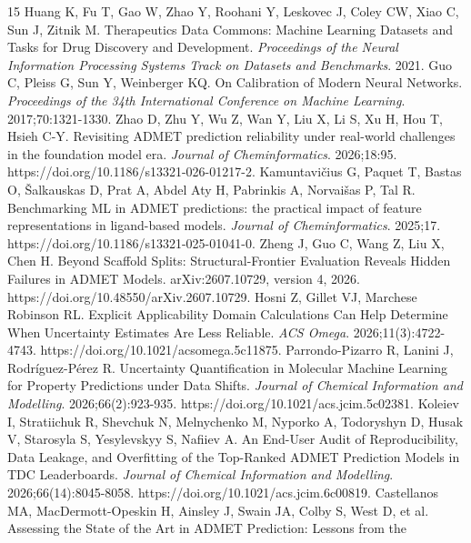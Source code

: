 \documentclass[
]{article}
\begin{document}
\begin{thebibliography}{15}
  Huang K, Fu T, Gao W, Zhao Y, Roohani Y, Leskovec J, Coley CW, Xiao C,
  Sun J, Zitnik M. Therapeutics Data Commons: Machine Learning Datasets
  and Tasks for Drug Discovery and Development. \emph{Proceedings of the
  Neural Information Processing Systems Track on Datasets and
  Benchmarks}. 2021.
  Guo C, Pleiss G, Sun Y, Weinberger KQ. On Calibration of Modern Neural
  Networks. \emph{Proceedings of the 34th International Conference on
  Machine Learning}. 2017;70:1321-1330.
  Zhao D, Zhu Y, Wu Z, Wan Y, Liu X, Li S, Xu H, Hou T, Hsieh C-Y.
  Revisiting ADMET prediction reliability under real-world challenges in
  the foundation model era. \emph{Journal of Cheminformatics}.
  2026;18:95. https://doi.org/10.1186/s13321-026-01217-2.
  Kamuntavičius G, Paquet T, Bastas O, Šalkauskas D, Prat A, Abdel Aty
  H, Pabrinkis A, Norvaišas P, Tal R. Benchmarking ML in ADMET
  predictions: the practical impact of feature representations in
  ligand-based models. \emph{Journal of Cheminformatics}. 2025;17.
  https://doi.org/10.1186/s13321-025-01041-0.
  Zheng J, Guo C, Wang Z, Liu X, Chen H. Beyond Scaffold Splits:
  Structural-Frontier Evaluation Reveals Hidden Failures in ADMET
  Models. arXiv:2607.10729, version 4, 2026.
  https://doi.org/10.48550/arXiv.2607.10729.
  Hosni Z, Gillet VJ, Marchese Robinson RL. Explicit Applicability Domain
  Calculations Can Help Determine When Uncertainty Estimates Are Less
  Reliable. \emph{ACS Omega}. 2026;11(3):4722-4743.
  https://doi.org/10.1021/acsomega.5c11875.
  Parrondo-Pizarro R, Lanini J, Rodríguez-Pérez R. Uncertainty Quantification
  in Molecular Machine Learning for Property Predictions under Data Shifts.
  \emph{Journal of Chemical Information and Modelling}. 2026;66(2):923-935.
  https://doi.org/10.1021/acs.jcim.5c02381.
  Koleiev I, Stratiichuk R, Shevchuk N, Melnychenko M, Nyporko A, Todoryshyn
  D, Husak V, Starosyla S, Yesylevskyy S, Nafiiev A. An End-User Audit of
  Reproducibility, Data Leakage, and Overfitting of the Top-Ranked ADMET
  Prediction Models in TDC Leaderboards. \emph{Journal of Chemical
  Information and Modelling}. 2026;66(14):8045-8058.
  https://doi.org/10.1021/acs.jcim.6c00819.
  Castellanos MA, MacDermott-Opeskin H, Ainsley J, Swain JA, Colby S, West D,
  et al. Assessing the State of the Art in ADMET Prediction: Lessons from the

\end{thebibliography}
\end{document}
